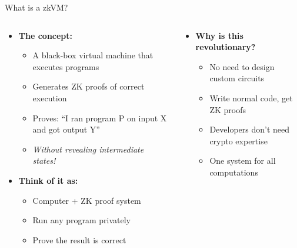 \documentclass[aspectratio=169, lualatex, handout]{beamer}
\begin{document}
\begin{frame}{What is a zkVM?}
	\begin{columns}[c]
		\begin{column}{0.5\textwidth}
			\begin{itemize}
				\item \textbf{The concept:}
				      \begin{itemize}
					      \item A black-box virtual machine that executes programs
					      \item Generates ZK proofs of correct execution
					      \item Proves: ``I ran program P on input X and got output Y''
					      \item \textit{Without revealing intermediate states!}
				      \end{itemize}
				\item \textbf{Think of it as:}
				      \begin{itemize}
					      \item Computer + ZK proof system
					      \item Run any program privately
					      \item Prove the result is correct
				      \end{itemize}
			\end{itemize}
		\end{column}
		\begin{column}{0.5\textwidth}
			\begin{itemize}
				\item \textbf{Why is this revolutionary?}
				      \begin{itemize}
					      \item No need to design custom circuits
					      \item Write normal code, get ZK proofs
					      \item Developers don't need crypto expertise
					      \item One system for all computations
				      \end{itemize}
			\end{itemize}
		\end{column}
	\end{columns}
\end{frame}
\end{document}
